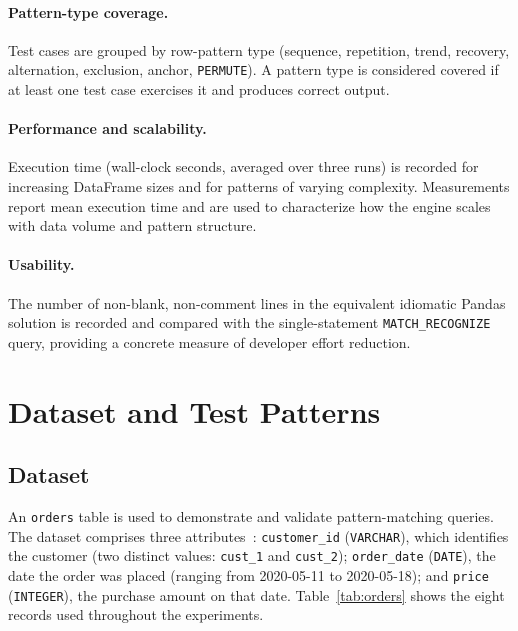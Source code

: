 \paragraph{Pattern-type coverage.}
Test cases are grouped by row-pattern type
(sequence, repetition, trend, recovery, alternation, exclusion,
anchor, \texttt{PERMUTE}).  A pattern type is considered covered
if at least one test case exercises it and produces correct output.

\paragraph{Performance and scalability.}
Execution time (wall-clock seconds, averaged over three runs) is
recorded for increasing DataFrame sizes and for patterns of
varying complexity.  Measurements report mean execution time and
are used to characterize how the engine scales with data volume
and pattern structure.

\paragraph{Usability.}
The number of non-blank, non-comment lines in the equivalent
idiomatic Pandas solution is recorded and compared with the
single-statement \texttt{MATCH\_RECOGNIZE} query, providing a
concrete measure of developer effort reduction.

\section{Dataset and Test Patterns}
\label{sec:eval-dataset}

\subsection{Dataset}
\label{subsec:eval-dataset-orders}

An \texttt{orders} table is used to demonstrate and validate
pattern-matching queries.  The dataset comprises three
attributes~\cite{trino2021row}: \texttt{customer\_id}
(\texttt{VARCHAR}), which identifies the customer (two distinct
values: \texttt{cust\_1} and \texttt{cust\_2});
\texttt{order\_date} (\texttt{DATE}), the date the order was placed
(ranging from 2020-05-11 to 2020-05-18); and \texttt{price}
(\texttt{INTEGER}), the purchase amount on that date.
Table~\ref{tab:orders} shows the eight records used throughout the
experiments.

